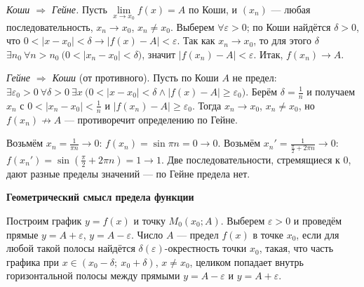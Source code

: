 \documentclass[a4paper,11pt]{article}
\newcommand{\eps}{\varepsilon}
\newcommand{\podr}[1]{\par\needspace{8\baselineskip}\medskip
  {\large\bfseries\textcolor{oprc!80!black}{#1}}\par\nopagebreak\smallskip}
\begin{document}
\begin{dop}
\textit{Коши $\Rightarrow$ Гейне.} Пусть $\lim\limits_{x \to x_0} f(x) = A$ по Коши, и $(x_n)$ --- любая последовательность,
$x_n \to x_0$, $x_n \ne x_0$. Выберем $\forall \eps > 0$; по Коши найдётся $\delta > 0$, что
$0 < |x - x_0| < \delta \to |f(x) - A| < \eps$. Так как $x_n \to x_0$, то для этого $\delta$
$\exists n_0\ \forall n > n_0\ \bigl(0 < |x_n - x_0| < \delta\bigr)$, значит $|f(x_n) - A| < \eps$. Итак, $f(x_n) \to A$.

\textit{Гейне $\Rightarrow$ Коши} (от противного). Пусть по Коши $A$ не предел:
$\exists \eps_0 > 0\ \forall \delta > 0\ \exists x\ \bigl(0 < |x - x_0| < \delta \wedge |f(x) - A| \ge \eps_0\bigr)$.
Берём $\delta = \frac1n$ и получаем $x_n$ с $0 < |x_n - x_0| < \frac1n$ и $|f(x_n) - A| \ge \eps_0$. Тогда $x_n \to x_0$,
$x_n \ne x_0$, но $f(x_n) \not\to A$ --- противоречит определению по Гейне.
\end{dop}

\begin{dop}[как по Гейне доказать, что предела нет: $f(x) = \sin\frac1x$ при $x \to 0$]
Возьмём $x_n = \frac{1}{\pi n} \to 0$: $f(x_n) = \sin \pi n = 0 \to 0$.
Возьмём $x_n' = \frac{1}{\frac\pi2 + 2\pi n} \to 0$: $f(x_n') = \sin\left(\frac\pi2 + 2\pi n\right) = 1 \to 1$.
Две последовательности, стремящиеся к $0$, дают разные пределы значений --- по Гейне предела нет.
\end{dop}

\podr{Геометрический смысл предела функции}

Построим график $y = f(x)$ и точку $M_0(x_0; A)$. Выберем $\eps > 0$ и проведём прямые $y = A + \eps$, $y = A - \eps$.
Число $A$ --- предел $f(x)$ в точке $x_0$, если для любой такой полосы найдётся $\delta(\eps)$-окрестность точки $x_0$, такая, что
часть графика при $x \in (x_0 - \delta;\ x_0 + \delta)$, $x \ne x_0$, целиком попадает внутрь горизонтальной полосы между прямыми
$y = A - \eps$ и $y = A + \eps$.

\begin{center}
\end{center}
\end{document}

